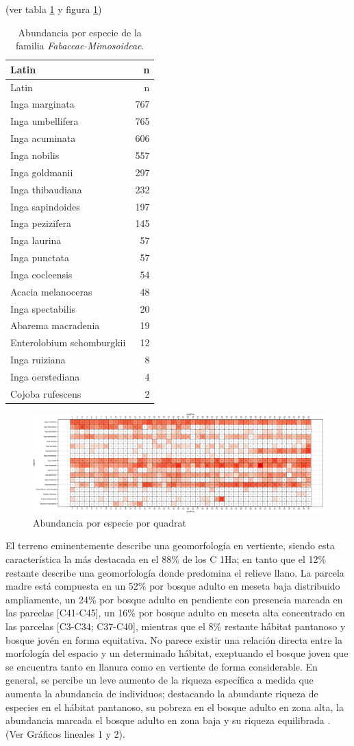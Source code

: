 \documentclass[11pt,]{article}
\begin{document}
(ver tabla \ref{tab:abun_sp} y figura \ref{fig:abun_sp_q})

\begin{longtable}[]{@{}lr@{}}
\caption{\label{tab:abun_sp}Abundancia por especie de la familia
\emph{Fabaceae-Mimosoideae}.}\tabularnewline
\toprule
Latin & n\tabularnewline
\midrule
\endfirsthead
\toprule
Latin & n\tabularnewline
\midrule
\endhead
Inga marginata & 767\tabularnewline
Inga umbellifera & 765\tabularnewline
Inga acuminata & 606\tabularnewline
Inga nobilis & 557\tabularnewline
Inga goldmanii & 297\tabularnewline
Inga thibaudiana & 232\tabularnewline
Inga sapindoides & 197\tabularnewline
Inga pezizifera & 145\tabularnewline
Inga laurina & 57\tabularnewline
Inga punctata & 57\tabularnewline
Inga cocleensis & 54\tabularnewline
Acacia melanoceras & 48\tabularnewline
Inga spectabilis & 20\tabularnewline
Abarema macradenia & 19\tabularnewline
Enterolobium schomburgkii & 12\tabularnewline
Inga ruiziana & 8\tabularnewline
Inga oerstediana & 4\tabularnewline
Cojoba rufescens & 2\tabularnewline
\bottomrule
\end{longtable}

\begin{figure}
\centering
\includegraphics{manuscrito_files/figure-latex/unnamed-chunk-3-1.pdf}
\caption{\label{fig:abun_sp_q}Abundancia por especie por quadrat}
\end{figure}

El terreno eminentemente describe una geomorfología en vertiente, siendo
esta característica la más destacada en el 88\% de los C 1Ha; en tanto
que el 12\% restante describe una geomorfología donde predomina el
relieve llano. La parcela madre está compuesta en un 52\% por bosque
adulto en meseta baja distribuido ampliamente, un 24\% por bosque adulto
en pendiente con presencia marcada en las parcelas {[}C41-C45{]}, un
16\% por bosque adulto en meseta alta concentrado en las parcelas
{[}C3-C34; C37-C40{]}, mientras que el 8\% restante hábitat pantanoso y
bosque jovén en forma equitativa. No parece existir una relación directa
entre la morfología del espacio y un determinado hábitat, exeptuando el
bosque joven que se encuentra tanto en llanura como en vertiente de
forma considerable. En general, se percibe un leve aumento de la riqueza
específica a medida que aumenta la abundancia de individuos; destacando
la abundante riqueza de especies en el hábitat pantanoso, su pobreza en
el bosque adulto en zona alta, la abundancia marcada el bosque adulto en
zona baja y su riqueza equilibrada . (Ver Gráficos lineales 1 y 2).
\end{document}
